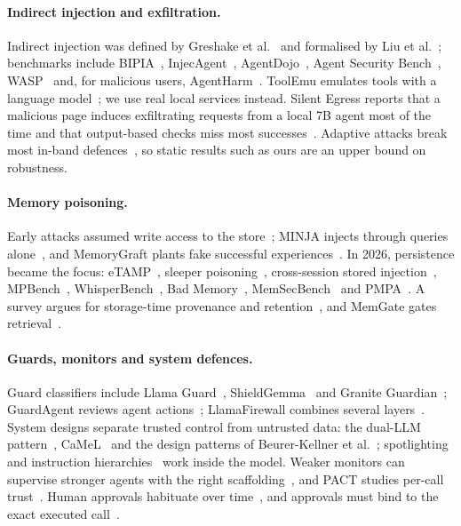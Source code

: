 \paragraph{Indirect injection and exfiltration.} Indirect injection was defined by Greshake et
al.~\citep{greshake2023indirect} and formalised by Liu et al.~\citep{liu2023formalizing}; benchmarks
include BIPIA~\citep{yi2023bipia}, InjecAgent~\citep{zhan2024injecagent},
AgentDojo~\citep{debenedetti2024agentdojo}, Agent Security Bench~\citep{zhang2024asb},
WASP~\citep{evtimov2025wasp} and, for malicious users, AgentHarm~\citep{andriushchenko2024agentharm}.
ToolEmu emulates tools with a language model~\citep{ruan2023toolemu}; we use real local services
instead. Silent Egress reports that a malicious page induces exfiltrating requests from a local 7B agent
most of the time and that output-based checks miss most successes~\citep{lan2026silentegress}. Adaptive
attacks break most in-band defences~\citep{narisetty2026adaptive}, so static results such as ours are an
upper bound on robustness.

\paragraph{Memory poisoning.} Early attacks assumed write access to the
store~\citep{zou2024poisonedrag,chen2024agentpoison}; MINJA injects through queries
alone~\citep{dong2025minja}, and MemoryGraft plants fake successful experiences~\citep{srivastava2025memorygraft}.
In 2026, persistence became the focus: eTAMP~\citep{zou2026etamp}, sleeper
poisoning~\citep{pulipaka2026sleeper}, cross-session stored injection~\citep{xie2026crosssession},
MPBench~\citep{dash2026mpbench}, WhisperBench~\citep{zhang2026whisperbench}, Bad
Memory~\citep{gadgil2026badmemory}, MemSecBench~\citep{chen2026memsecbench} and
PMPA~\citep{huang2026pmpa}. A survey argues for storage-time provenance and
retention~\citep{lin2026ltmsurvey}, and MemGate gates retrieval~\citep{zhang2026memgate}.

\paragraph{Guards, monitors and system defences.} Guard classifiers include Llama
Guard~\citep{inan2023llamaguard}, ShieldGemma~\citep{zeng2024shieldgemma} and Granite
Guardian~\citep{padhi2024graniteguardian}; GuardAgent reviews agent actions~\citep{xiang2024guardagent};
LlamaFirewall combines several layers~\citep{chennabasappa2025llamafirewall}. System designs separate
trusted control from untrusted data: the dual-LLM pattern~\citep{willison2023dualllm},
CaMeL~\citep{debenedetti2025camel} and the design patterns of Beurer-Kellner et
al.~\citep{beurerkellner2025patterns}; spotlighting~\citep{hines2024spotlighting} and instruction
hierarchies~\citep{wallace2024hierarchy} work inside the model. Weaker monitors can supervise stronger
agents with the right scaffolding~\citep{kale2025weaktostrong}, and PACT studies per-call
trust~\citep{fan2026pact}. Human approvals habituate over time~\citep{yu2026habituation}, and approvals
must bind to the exact executed call~\citep{kumar2026loopjacking}.

